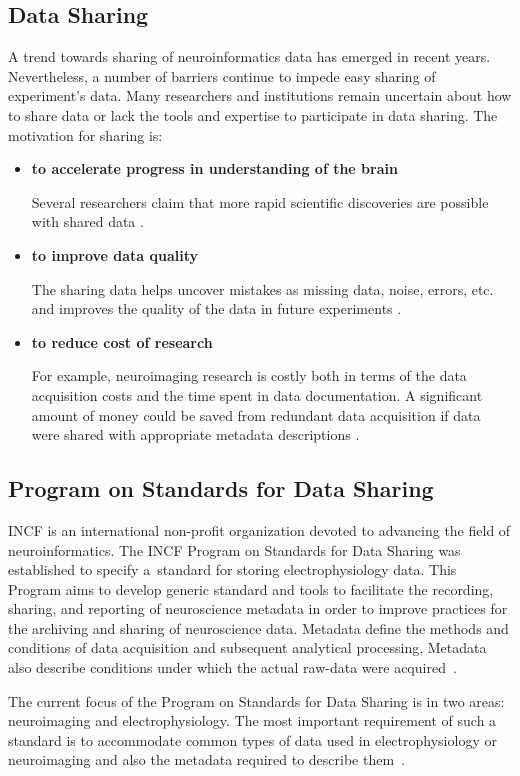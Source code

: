 \documentclass[conference]{IEEEtran}
\begin{document}
\subsection{Data Sharing}
A trend towards sharing of neuroinformatics data has emerged in recent years. Nevertheless, a number of barriers continue to impede easy sharing of experiment's data. Many researchers and institutions remain uncertain about how to share data or lack the tools and expertise to participate in data sharing. The motivation for sharing is:
\begin{itemize}
	\item \textbf{to accelerate progress in understanding of the brain}
	
	
	Several researchers claim that more rapid scientific discoveries are possible with shared data \cite{Milham2012} \cite{Poldrack2012}.
	\item \textbf{to improve data quality}
	
	The sharing data helps uncover mistakes as missing data, noise, errors, etc. and improves the quality of the data in future experiments \cite{Poline2012}.
	\item  \textbf{to reduce cost of research}
	
	For example, neuroimaging research is costly both in terms of the data acquisition costs and the time spent in data documentation. A significant amount of money could be saved from redundant data acquisition if data were shared with appropriate metadata descriptions \cite{Poline2012}.
	\end{itemize}


\subsection{Program on Standards for Data Sharing}
\label{incf}
INCF is an international non-profit organization devoted to advancing the field of neuroinformatics. The INCF Program on Standards for Data Sharing was established to specify a~standard for storing electrophysiology data.  This Program aims to develop generic standard and tools to facilitate the recording, sharing, and reporting of neuroscience metadata in order to improve practices for the archiving and sharing of neuroscience data. Metadata define the methods and conditions of data acquisition and subsequent analytical processing, Metadata also describe conditions under which the actual raw-data were acquired~\cite{incf_mission}.

The current focus of the Program on Standards for Data Sharing is in two areas: neuroimaging and electrophysiology. The most important requirement of such a standard is to accommodate common types of data used in electrophysiology or neuroimaging and also the metadata required to describe them~\cite{incf_mission}.
\end{document}
